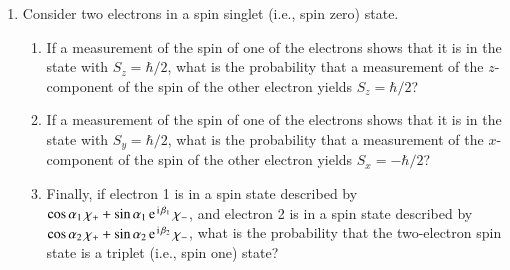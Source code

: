 \begin{enumerate}[label=\thechapter.\arabic*,leftmargin=*,widest=9.20]
\item Consider two electrons in a spin singlet (i.e., spin zero) state.
\begin{enumerate}
\item If a measurement of the spin of one of the electrons shows that it
is in the state with $S_z=\hbar/2$, what is the probability that a
measurement of the $z$-component of the spin of the
other electron yields $S_z=\hbar/2$?
\item If a measurement of the spin of one of the electrons shows
that it is in the state with $S_y=\hbar/2$, what is the probability that a
measurement of the $x$-component of the spin of the
other electron yields $S_x=-\hbar/2$?
\item Finally, if electron 1 is in a spin state described by $\cos\alpha_1\,\chi_+
+ \sin\alpha_1\,{\rm e}^{\,{\rm i}\,\beta_1}\,\chi_-$, and
electron 2 is in a spin state described by  $\cos\alpha_2\,\chi_+
+ \sin\alpha_2\,{\rm e}^{\,{\rm i}\,\beta_2}\,\chi_-$, what is
the probability that the two-electron spin state is a triplet (i.e., spin one) state?
\end{enumerate}
\end{enumerate}